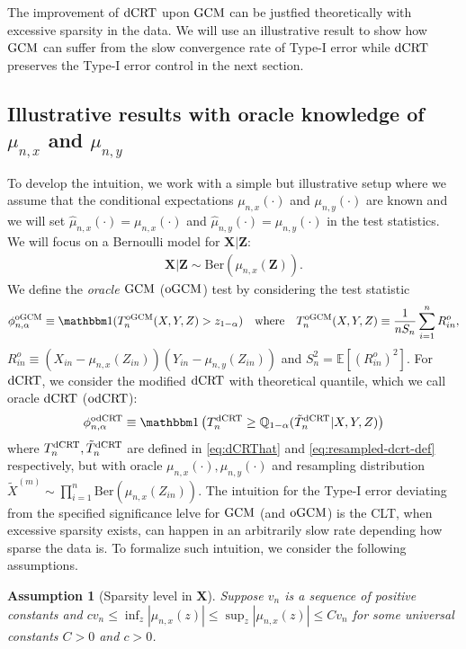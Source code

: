 \documentclass[12pt]{article}
\newtheorem{assumption}{Assumption}
\theoremstyle{definition}
\newcommand{\E}{\mathbb E}								%
\newcommand{\Q}{\mathbb{Q}}								%
\newcommand{\indicator}{\mathbbm 1}						%
\newcommand{\prx}{\bm X}								%
\newcommand{\srx}{X}									%
\newcommand{\prz}{\bm Z}								%
\newcommand{\srz}{Z}									%
\newcommand{\sry}{Y}									%
\newcommand{\dCRT}{\textnormal{dCRT}} 					%
\newcommand{\odCRT}{\textnormal{odCRT}} 					%
\newcommand{\GCM}{\textnormal{GCM}}						%
\newcommand{\oGCM}{\textnormal{oGCM}}						%
\begin{document}
The improvement of $\dCRT$ upon $\GCM$ can be justfied theoretically with excessive sparsity in the data. We will use an illustrative result to show how $\GCM$ can suffer from the slow convergence rate of Type-I error while $\dCRT$ preserves the Type-I error control in the next section.


\subsection{Illustrative results with oracle knowledge of $\mu_{n,x}$ and $\mu_{n,y}$}

To develop the intuition, we work with a simple but illustrative setup where we assume that the conditional expectations $\mu_{n,x}(\cdot)$ and $\mu_{n,y}(\cdot)$ are known and we will set $\widehat{\mu}_{n,x}(\cdot) = \mu_{n,x}(\cdot)$ and $\widehat{\mu}_{n,y}(\cdot) = \mu_{n,y}(\cdot)$ in the test statistics. We will focus on a Bernoulli model for $\prx|\prz$:
\begin{align}\label{eq:illustrative_bernoulli}
  \prx|\prz\sim \mathrm{Ber}(\mu_{n,x}(\prz)).
\end{align}
We define the \textit{oracle $\GCM$} ($\oGCM$) test by considering the test statistic 
\begin{align}\label{eq:oGCM}
  \phi_{n,\alpha}^{\oGCM}\equiv \indicator(T_n^{\oGCM}(\srx,\sry,\srz)>z_{1-\alpha})\quad\text{where}\quad T_{n}^{\oGCM}(\srx,\sry,\srz)\equiv\frac{1}{nS_n}\sum_{i=1}^{n}R_{in}^o,
\end{align}
$R_{in}^o\equiv(\srx_{in}-\mu_{n,x}(\srz_{in}))(\sry_{in}-\mu_{n,y}(\srz_{in}))$
and $S_n^2=\E[(R_{in}^o)^2]$. For $\dCRT$, we consider the modified $\dCRT$ with theoretical quantile, which we call oracle $\dCRT$ ($\odCRT$):
\begin{align*}
  \phi^{\odCRT}_{n,\alpha}\equiv \indicator\left(T_n^{\dCRT}\geq \Q_{1-\alpha}(\tilde T_{n}^{\dCRT}|\srx,\sry,\srz)\right)
\end{align*}
where $T_n^{\dCRT},\tilde T_{n}^{\dCRT}$ are defined in \eqref{eq:dCRThat} and \eqref{eq:resampled-dcrt-def} respectively, but with oracle $\mu_{n,x}(\cdot),\mu_{n,y}(\cdot)$ and resampling distribution $\widetilde{X}^{(m)}\sim \prod_{i=1}^n \mathrm{Ber}(\mu_{n,x}(\srz_{in}))$. The intuition for the Type-I error deviating from the specified significance lelve for $\GCM$ (and $\oGCM$) is the CLT, when excessive sparsity exists, can happen in an arbitrarily slow rate depending how sparse the data is. To formalize such intuition, we consider the following assumptions.
\begin{assumption}[Sparsity level in $\prx$]\label{assu:sparsity}
  Suppose $v_n$ is a sequence of positive constants and $cv_n\leq\inf_{z}|\mu_{n,x}(z)|\leq \sup_{z}|\mu_{n,x}(z)|\leq Cv_n$ for some universal constants $C>0$ and $c>0$. 
\end{assumption}
\end{document}
